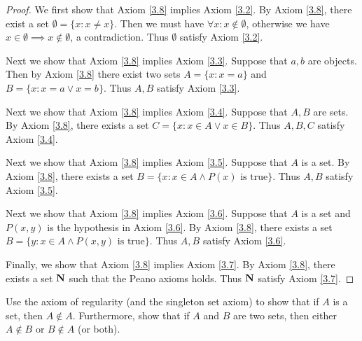 \begin{proof}
    We first show that Axiom \ref{3.8} implies Axiom \ref{3.2}.
    By Axiom \ref{3.8}, there exist a set \(\emptyset = \{x: x \neq x\}\).
    Then we must have \(\forall x : x \notin \emptyset\), otherwise we have \(x \in \emptyset \implies x \notin \emptyset\), a contradiction.
    Thus \(\emptyset\) satisfy Axiom \ref{3.2}.

    Next we show that Axiom \ref{3.8} implies Axiom \ref{3.3}.
    Suppose that \(a, b\) are objects.
    Then by Axiom \ref{3.8} there exist two sets \(A = \{x: x = a\}\) and \(B = \{x: x = a \lor x = b\}\).
    Thus \(A, B\) satisfy Axiom \ref{3.3}.

    Next we show that Axiom \ref{3.8} implies Axiom \ref{3.4}.
    Suppose that \(A, B\) are sets.
    By Axiom \ref{3.8}, there exists a set \(C = \{x : x \in A \lor x \in B\}\).
    Thus \(A, B, C\) satisfy Axiom \ref{3.4}.

    Next we show that Axiom \ref{3.8} implies Axiom \ref{3.5}.
    Suppose that \(A\) is a set.
    By Axiom \ref{3.8}, there exists a set \(B = \{x : x \in A \land P(x) \text{ is true}\}\).
    Thus \(A, B\) satisfy Axiom \ref{3.5}.

    Next we show that Axiom \ref{3.8} implies Axiom \ref{3.6}.
    Suppose that \(A\) is a set and \(P(x, y)\) is the hypothesis in Axiom \ref{3.6}.
    By Axiom \ref{3.8}, there exists a set \(B = \{y :  x \in A \land P(x, y) \text{ is true}\}\).
    Thus \(A, B\) satisfy Axiom \ref{3.6}.

    Finally, we show that Axiom \ref{3.8} implies Axiom \ref{3.7}.
    By Axiom \ref{3.8}, there exists a set \(\mathbf{N}\) such that the Peano axioms holds.
    Thus \(\mathbf{N}\) satisfy Axiom \ref{3.7}.
\end{proof}

\begin{exercise}\label{ex 3.2.2}
    Use the axiom of regularity (and the singleton set axiom) to show that if \(A\) is a set, then \(A \notin A\).
    Furthermore, show that if \(A\) and \(B\) are two sets, then either \(A \notin B\) or \(B \notin A\) (or both).
\end{exercise}

